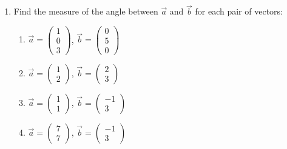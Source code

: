 \documentclass[12pt, twoside]{article}
\begin{document}
\begin{enumerate}[itemsep=1cm]
    
    \newpage
    \item Find the measure of the angle between $\vec{a}$ and $\vec{b}$ for each pair of vectors:
    
    
    \begin{enumerate}[itemsep=1cm]
    \item $\vec{a} = \begin{pmatrix} 1 \\ 0 \\ 3 \end{pmatrix}$, \hspace{.4cm}
    $\vec{b} = \begin{pmatrix} 0 \\ 5 \\ 0 \end{pmatrix}$
    
    \item $\vec{a} = \begin{pmatrix} 1 \\ 2 \end{pmatrix}$, \hspace{.4cm}
    $\vec{b} = \begin{pmatrix} 2 \\ 3 \end{pmatrix}$
    
    \item $\vec{a} = \begin{pmatrix} 1 \\ 1 \end{pmatrix}$, \hspace{.4cm}
    $\vec{b} = \begin{pmatrix} -1 \\ 3 \end{pmatrix}$
    
    \item $\vec{a} = \begin{pmatrix} 7 \\ 7 \end{pmatrix}$, \hspace{.4cm}
    $\vec{b} = \begin{pmatrix} -1 \\ 3 \end{pmatrix}$
    \end{enumerate}

    \vspace{1cm}


\end{enumerate}
\end{document}
